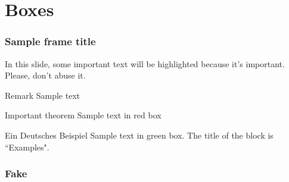 \documentclass[12pt, aspectratio=169]{beamer}
\begin{document}
\section{Boxes}
\begin{frame}
\frametitle{Sample frame title}

In this slide, some important text will be
\alert{highlighted} because it's important.
Please, don't abuse it.

\begin{block}{Remark}
Sample text
\end{block}

\begin{alertblock}{Important theorem}
Sample text in red box
\end{alertblock}

\begin{exampleblock}{Ein Deutsches Beispiel}
Sample text in green box. The title of the block is ``Examples".
\end{exampleblock}
\end{frame}

\begin{frame}
    \frametitle{Fake}

    

\end{frame}
\end{document}
